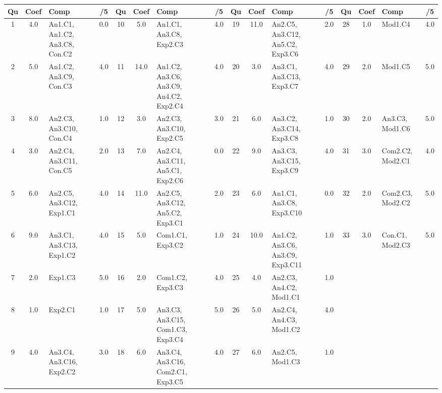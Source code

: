\begin{center} 
\begin{tabular}{|c|c|m{1cm}|c||c|c|m{1cm}|c||c|c|m{1cm}|c||c|c|m{1cm}|c|} 
\hline \textbf{Qu} & \textbf{Coef} & \textbf{Comp} & \textbf{/5} & \textbf{Qu} & \textbf{Coef} & \textbf{Comp} & \textbf{/5} & \textbf{Qu} & \textbf{Coef} & \textbf{Comp} & \textbf{/5} & \textbf{Qu} & \textbf{Coef} & \textbf{Comp} & \textbf{/5} \\ 
\hline 
\hline 
1 & 4.0 & An1.C1, An1.C2, An3.C8, Con.C2 & 0.0 & 10 & 5.0 & An1.C1, An3.C8, Exp2.C3 & 4.0 & 19 & 11.0 & An2.C5, An3.C12, An5.C2, Exp3.C6 & 2.0 & 28 & 1.0 & Mod1.C4 & 4.0 \\ \hline 
2 & 5.0 & An1.C2, An3.C9, Con.C3 & 4.0 & 11 & 14.0 & An1.C2, An3.C6, An3.C9, An4.C2, Exp2.C4 & 4.0 & 20 & 3.0 & An3.C1, An3.C13, Exp3.C7 & 4.0 & 29 & 2.0 & Mod1.C5 & 5.0 \\ \hline 
3 & 8.0 & An2.C3, An3.C10, Con.C4 & 1.0 & 12 & 3.0 & An2.C3, An3.C10, Exp2.C5 & 3.0 & 21 & 6.0 & An3.C2, An3.C14, Exp3.C8 & 1.0 & 30 & 2.0 & An3.C3, Mod1.C6 & 5.0 \\ \hline 
4 & 3.0 & An2.C4, An3.C11, Con.C5 & 2.0 & 13 & 7.0 & An2.C4, An3.C11, An5.C1, Exp2.C6 & 0.0 & 22 & 9.0 & An3.C3, An3.C15, Exp3.C9 & 4.0 & 31 & 3.0 & Com2.C2, Mod2.C1 & 4.0 \\ \hline 
5 & 6.0 & An2.C5, An3.C12, Exp1.C1 & 4.0 & 14 & 11.0 & An2.C5, An3.C12, An5.C2, Exp3.C1 & 2.0 & 23 & 6.0 & An1.C1, An3.C8, Exp3.C10 & 0.0 & 32 & 2.0 & Com2.C3, Mod2.C2 & 5.0 \\ \hline 
6 & 9.0 & An3.C1, An3.C13, Exp1.C2 & 4.0 & 15 & 5.0 & Com1.C1, Exp3.C2 & 1.0 & 24 & 10.0 & An1.C2, An3.C6, An3.C9, Exp3.C11 & 1.0 & 33 & 3.0 & Con.C1, Mod2.C3 & 5.0 \\ \hline 
7 & 2.0 & Exp1.C3 & 5.0 & 16 & 2.0 & Com1.C2, Exp3.C3 & 4.0 & 25 & 4.0 & An2.C3, An4.C2, Mod1.C1 & 1.0 &  &  &  &  \\ \hline 

8 & 1.0 & Exp2.C1 & 1.0 & 17 & 5.0 & An3.C3, An3.C15, Com1.C3, Exp3.C4 & 5.0 & 26 & 5.0 & An2.C4, An4.C3, Mod1.C2 & 4.0 &  &  &  &  \\ \hline 

9 & 4.0 & An3.C4, An3.C16, Exp2.C2 & 3.0 & 18 & 6.0 & An3.C4, An3.C16, Com2.C1, Exp3.C5 & 4.0 & 27 & 6.0 & An2.C5, Mod1.C3 & 1.0 &  &  &  &  \\ \hline 

\end{tabular} 
\end{center} 
\normalsize 
 
